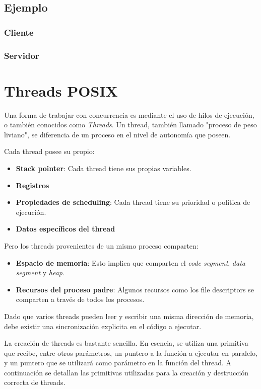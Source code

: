 \documentclass[a4paper, twoside]{article}
\newcommand{\codedir}{../resources/code} %
\begin{document}
\newpage
\subsection{Ejemplo}
\subsubsection{Cliente}


\newpage
\subsubsection{Servidor}


\newpage
\section{Threads POSIX}
Una forma de trabajar con concurrencia es mediante el uso de hilos de ejecución, o también conocidos como \emph{Threads}. Un thread, también llamado "proceso de peso liviano", se diferencia de un proceso en el nivel de autonomía que poseen.

Cada thread posee su propio:
\begin{itemize}
	\item \textbf{Stack pointer}: Cada thread tiene sus propias variables.
	\item \textbf{Registros}
	\item \textbf{Propiedades de scheduling}: Cada thread tiene su prioridad o política de ejecución.
	\item \textbf{Datos específicos del thread}
\end{itemize}

Pero los threads provenientes de un mismo proceso comparten:
\begin{itemize}
	\item \textbf{Espacio de memoria}: Esto implica que comparten el \emph{code segment}, \emph{data segment} y \emph{heap}.
	\item \textbf{Recursos del proceso padre}: Algunos recursos como los file descriptors se comparten a través de todos los procesos.
\end{itemize}

Dado que varios threads pueden leer y escribir una misma dirección de memoria, debe existir una sincronización explicita en el código a ejecutar.

La creación de threads es bastante sencilla. En esencia, se utiliza una primitiva que recibe, entre otros parámetros, un puntero a la función a ejecutar en paralelo, y un puntero que se utilizará como parámetro en la función del thread. A continuación se detallan las primitivas utilizadas para la creación y destrucción correcta de threads.
\end{document}
